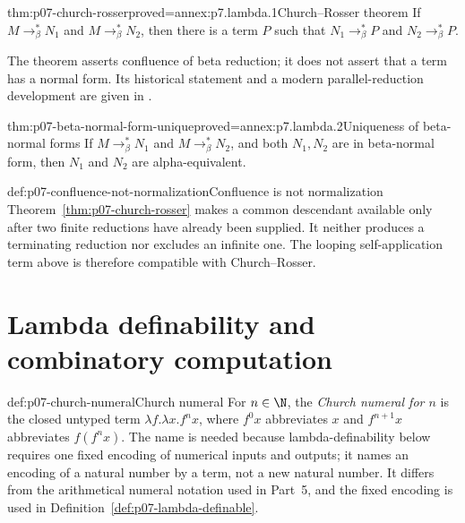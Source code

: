 \begin{hbtheorem}{thm:p07-church-rosser}{proved=annex:p7.lambda.1}{Church--Rosser theorem}
If
\(M\longrightarrow_{\beta}^{*}N_1\) and
\(M\longrightarrow_{\beta}^{*}N_2\), then there is a term \(P\) such that
\(N_1\longrightarrow_{\beta}^{*}P\) and
\(N_2\longrightarrow_{\beta}^{*}P\).
\end{hbtheorem}

The theorem asserts confluence of beta reduction; it does not assert that a
term has a normal form.  Its historical statement and a modern
parallel-reduction development are given in
\cite{ChurchRosser1936,GirardLafontTaylor1989}.

\begin{hbcorollary}{thm:p07-beta-normal-form-unique}{proved=annex:p7.lambda.2}{Uniqueness of beta-normal forms}
If \(M\longrightarrow_{\beta}^{*}N_1\) and
\(M\longrightarrow_{\beta}^{*}N_2\), and both \(N_1,N_2\) are in beta-normal
form, then \(N_1\) and \(N_2\) are alpha-equivalent.
\end{hbcorollary}

\begin{hbwarning}{def:p07-confluence-not-normalization}{Confluence is not normalization}
Theorem~\ref{thm:p07-church-rosser} makes a common descendant available only
after two finite reductions have already been supplied.  It neither produces
a terminating reduction nor excludes an infinite one.  The looping
self-application term above is therefore compatible with Church--Rosser.
\end{hbwarning}

\section[Lambda definability]{Lambda definability and combinatory computation}

\begin{hbdefinition}{def:p07-church-numeral}{Church numeral}
For \(n\in\N\), the \emph{Church numeral for \(n\)} is the closed untyped term
\(\lambda f.\lambda x.f^n x\), where \(f^0x\) abbreviates \(x\) and
\(f^{n+1}x\) abbreviates \(f(f^nx)\).  The name is needed because
lambda-definability below requires one fixed encoding of numerical inputs and
outputs; it names an encoding of a natural number by a term, not a new natural
number.  It differs from the arithmetical numeral notation used in Part~5,
and the fixed encoding is used in Definition~\ref{def:p07-lambda-definable}.
\end{hbdefinition}

